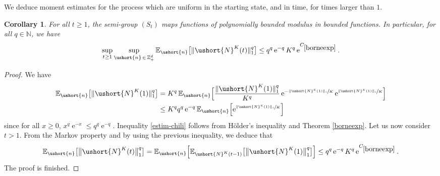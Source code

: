 \documentclass[11pt]{article}
\numberwithin{equation}{section}
\theoremstyle{plain}
\newtheorem{corollary}[theorem]{Corollary}
\theoremstyle{definition}
\newcommand{\cte}[1]{C_{\eqref{#1}}}
\newcommand{\E}{{\mathbb{E}}}
\newcommand{\zentiers}{{\mathbb{Z}}}
\newcommand{\integers}{\mathbb{N}}
\newcommand{\sdomaine}{{\zentiers}_+^d}
\newcommand{\vecn}{\ushort{n}}
\newcommand{\leproc}{\ushort{N}^{K}}
\newcommand{\sleproc}{\ushort{N}^{K}}
\newcommand{\e}{\operatorname{e}}
\begin{document}
We deduce moment estimates for the process which are uniform in the starting state, and in time, for times larger than $1$.
\begin{corollary}\label{auxbornees}
For all $t\ge1$, the semi-group $(S_{t})$ maps functions of polynomially bounded modulus in bounded
functions.
In particular, for all $q\in\integers$, we have
\begin{equation}
\label{estim-chili}
\sup_{t\geq 1}\sup_{\vecn\,\in\, \sdomaine} \E_{\vecn} \bigl[\|\leproc(t)\|_1^{q}\bigr]
\leq q^q \e^{-q} K^q \e^{\cte{borneexp}}.
\end{equation}
\end{corollary}
\begin{proof}
We have
\begin{align*}
\E_{\vecn} \bigl[\|\leproc(1)\|_1^{q}\bigr]
& = K^q\, \E_{\vecn}\Bigl[\frac{\|\leproc(1)\|_1^{q}}{K^q} \e^{-\sfrac{\|\sleproc(1)\|_{1}}{K}} \e^{\sfrac{\|\sleproc(1)\|_{1}}{K}}\Bigr]\\
& \leq K^q q^q \e^{-q} \E_{\vecn} \Bigl[\e^{\sfrac{\|\sleproc(1)\|_{1}}{K}}\Bigr]
\end{align*}
since for all $x\geq 0$, $x^q \e^{-x}\leq q^q \e^{-q}$.
Inequality \eqref{estim-chili} follows from Hölder's inequality and Theorem \ref{borneexp}.
Let us now consider $t> 1$. From the Markov property and by using the previous inequality, we deduce that
\[
\E_{\vecn}\bigl[\big\|\leproc(t)\big\|_1^{q}\bigr]
= \E_{\vecn}\Bigl[\E_{\sleproc(t-1)}\bigl[\big\|\leproc(1)\big\|^{q}_1\bigr]\Bigr]
\le q^q \e^{-q} K^q \e^{\cte{borneexp}}.
\]
The proof is finished.
\end{proof}
\end{document}
